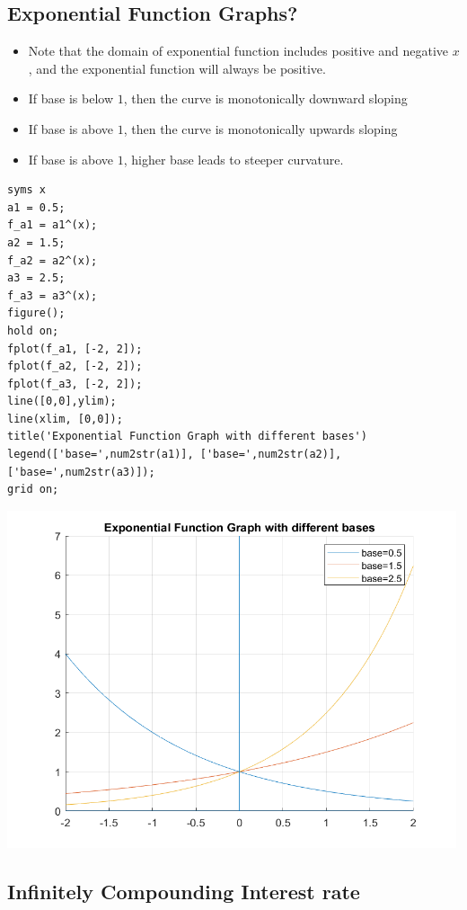 \documentclass[
]{book}
\begin{document}
\hypertarget{exponential-function-graphs}{%
\subsection{Exponential Function Graphs?}\label{exponential-function-graphs}}

\begin{itemize}
\item
  Note that the domain of exponential function includes positive and
  negative \(x\), and the exponential function will always be positive.
\item
  If base is below \(1\), then the curve is monotonically downward
  sloping
\item
  If base is above \(1\), then the curve is monotonically upwards
  sloping
\item
  If base is above \(1\), higher base leads to steeper curvature.
\end{itemize}

\begin{verbatim}
syms x
a1 = 0.5;
f_a1 = a1^(x);
a2 = 1.5;
f_a2 = a2^(x);
a3 = 2.5;
f_a3 = a3^(x);
figure();
hold on;
fplot(f_a1, [-2, 2]);
fplot(f_a2, [-2, 2]);
fplot(f_a3, [-2, 2]);
line([0,0],ylim);
line(xlim, [0,0]);
title('Exponential Function Graph with different bases')
legend(['base=',num2str(a1)], ['base=',num2str(a2)],['base=',num2str(a3)]);
grid on;
\end{verbatim}

\includegraphics[width=5.20833in,height=\textheight]{img/exponential_images/figure_0.png}

\hypertarget{infinitely-compounding-interest-rate}{%
\subsection{Infinitely Compounding Interest rate}\label{infinitely-compounding-interest-rate}}
\end{document}
